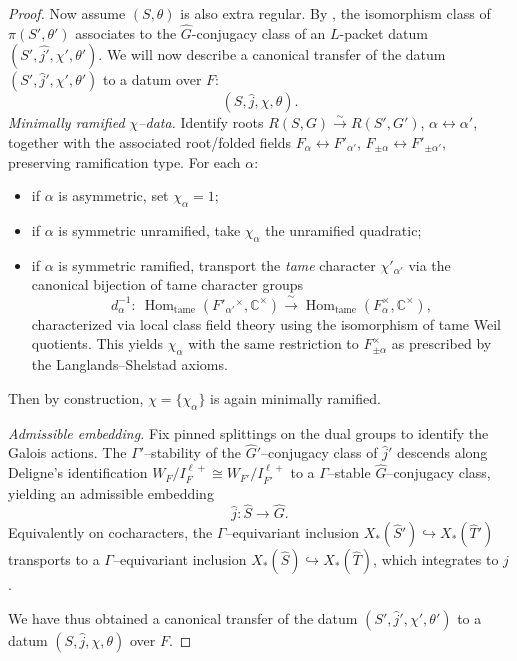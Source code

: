 \documentclass[american]{article}
\numberwithin{equation}{section}
\numberwithin{figure}{section}
\theoremstyle{plain}
\theoremstyle{definition}
\theoremstyle{remark}
\DeclareMathOperator{\Hom}{Hom}
\newcommand{\C}{\mathbb{C}}
\begin{document}
\begin{proof}
Now assume \((S,\theta)\) is also extra regular. By \cite[Proposition 5.2.7]{KalethaRegSC}, the isomorphism class of \(\pi(S',\theta')\) associates to the \(\widehat{G}\)-conjugacy class of an \(L\)-packet datum \((S',\widehat{j'},\chi',\theta')  \). We will now describe a canonical transfer of the datum $(S',\widehat{j}',\chi',\theta')$ to a datum over $F$:
\[
(S,\widehat{j},\chi,\theta).
\]
\emph{Minimally ramified $\chi$--data.} Identify roots $R(S,G)\xrightarrow{\sim} R(S',G')$, $\alpha\leftrightarrow \alpha'$, together with the associated root/folded fields $F_{\alpha}\leftrightarrow F'_{\alpha'}$, $F_{\pm\alpha}\leftrightarrow F'_{\pm\alpha'}$, preserving ramification type. For each $\alpha$:
  \begin{itemize}
    \item if $\alpha$ is asymmetric, set $\chi_{\alpha}=1$;
    \item if $\alpha$ is symmetric unramified, take $\chi_{\alpha}$ the unramified quadratic;
    \item if $\alpha$ is symmetric ramified, transport the \emph{tame} character $\chi'_{\alpha'}$ via the canonical bijection of tame character groups
    \[
      d_{\alpha}^{-1}:\ \Hom_{\mathrm{tame}}(F'_{\alpha'}{}^\times,\C^\times)\xrightarrow{\ \sim\ }\Hom_{\mathrm{tame}}(F_{\alpha}^\times,\C^\times),
    \]
characterized via local class field theory using the isomorphism of tame Weil quotients. This yields $\chi_{\alpha}$ with the same restriction to $F_{\pm\alpha}^\times$ as prescribed by the Langlands--Shelstad axioms. 
\end{itemize}
Then by construction, $\chi=\{\chi_{\alpha}\}$ is again minimally ramified. 

\emph{Admissible embedding.} Fix pinned splittings on the dual groups to identify the Galois actions. The $\Gamma'$--stability of the $\widehat{G}'$--conjugacy class of $\widehat{j}'$ descends along Deligne's identification $W_F/I_F^{\ell+}\!\cong W_{F'}/I_{F'}^{\ell+}$ to a $\Gamma$--stable $\widehat{G}$--conjugacy class, yielding an admissible embedding
  \[
    \widehat{j}:\widehat{S}\longrightarrow \widehat{G}.
  \]
Equivalently on cocharacters, the $\Gamma$--equivariant inclusion $X_\ast(\widehat{S}')\hookrightarrow X_\ast(\widehat{T}')$ transports to a $\Gamma$--equivariant inclusion $X_\ast(\widehat{S})\hookrightarrow X_\ast(\widehat{T})$, which integrates to $\widehat{j}$.

We have thus obtained a canonical transfer of the datum $(S',\widehat{j}',\chi',\theta')$ to a datum  \((S,\widehat{j},\chi,\theta)\) over $F$.


\end{proof}
\end{document}
